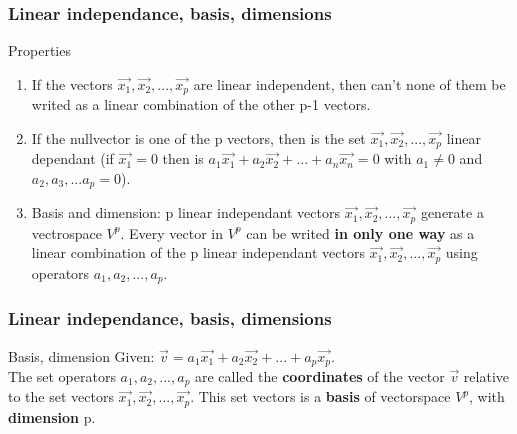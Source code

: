 \begin{frame}
	\frametitle{Linear independance, basis, dimensions}
	\begin{block}{Properties}
		\begin{enumerate}
			\item If the vectors $\overrightarrow{x_1},\overrightarrow{x_2},...,\overrightarrow{x_p}$ are linear independent, then can't none of them be writed as a linear combination of the other p-1 vectors.
			\item If the nullvector is one of the p vectors, then is the set $\overrightarrow{x_1},\overrightarrow{x_2},...,\overrightarrow{x_p}$ linear dependant (if $\overrightarrow{x_1}=0$ then is $a_1\overrightarrow{x_1}+a_2\overrightarrow{x_2}+...+a_n\overrightarrow{x_n}=0$ with $a_1\neq0$ and $a_2,a_3,...a_p=0$).
			\item Basis and dimension: p linear independant vectors $\overrightarrow{x_1},\overrightarrow{x_2},...,\overrightarrow{x_p}$ generate a vectrospace $V^p$. Every vector in $V^p$ can be writed {\bf in only one way} as a linear combination of the p linear independant vectors $\overrightarrow{x_1},\overrightarrow{x_2},...,\overrightarrow{x_p}$ using operators $a_1,a_2,...,a_p$.
		\end{enumerate}
	\end{block}
\end{frame}

\begin{frame}
	\frametitle{Linear independance, basis, dimensions}
	\begin{block}{Basis, dimension}
		Given: $\overrightarrow{v}=a_1\overrightarrow{x_1}+a_2\overrightarrow{x_2}+...+a_p\overrightarrow{x_p}$.\\
		The set operators $a_1,a_2,...,a_p$ are called the {\bf coordinates} of the vector $\overrightarrow{v}$ relative to the set vectors $\overrightarrow{x_1},\overrightarrow{x_2},...,\overrightarrow{x_p}$. This set vectors is a {\bf basis} of vectorspace $V^p$, with {\bf dimension} p.
	\end{block}
\end{frame}

